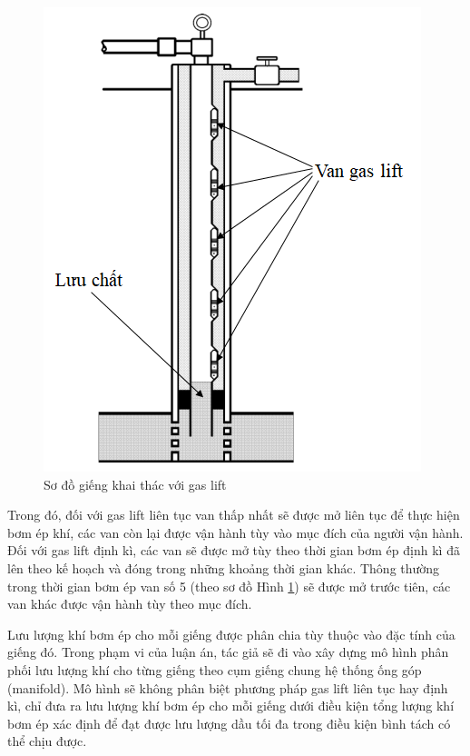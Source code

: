 \documentclass[12pt,a4paper]{report}
\begin{document}
	\begin{figure}[h]
		\centering
		\includegraphics[scale=0.7]{fig/continuous-gas-lift.png}
		\caption{Sơ đồ giếng khai thác với gas lift}
		\label{fig:continuous-gas-lift}
	\end{figure}

Trong đó, đối với gas lift liên tục van thấp nhất sẽ được mở liên tục để thực hiện bơm ép khí, các van còn lại được vận hành tùy vào mục đích của người vận hành. Đối với gas lift định kì, các van sẽ được mở tùy theo thời gian bơm ép định kì đã lên theo kế hoạch và đóng trong những khoảng thời gian khác. Thông thường trong thời gian bơm ép van số 5 (theo sơ đồ Hình \ref{fig:continuous-gas-lift}) sẽ được mở trước tiên, các van khác được vận hành tùy theo mục đích.

Lưu lượng khí bơm ép cho mỗi giếng được phân chia tùy thuộc vào đặc tính của giếng đó. Trong phạm vi của luận án, tác giả sẽ đi vào xây dựng mô hình phân phối lưu lượng khí cho từng giếng theo cụm giếng chung hệ thống ống góp (manifold). Mô hình sẽ không phân biệt phương pháp gas lift liên tục hay định kì, chỉ đưa ra lưu lượng khí bơm ép cho mỗi giếng dưới điều kiện tổng lượng khí bơm ép xác định để đạt được lưu lượng dầu tối đa trong điều kiện bình tách có thể chịu được.\\
\end{document}
